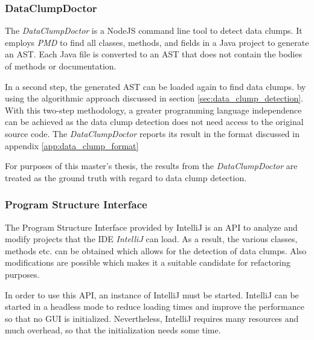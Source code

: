 \subsubsection{DataClumpDoctor} \label{sec:data_clump_doctor}

The  \textit{DataClumpDoctor} is a NodeJS command line tool  to detect data clumps. It employs \textit{PMD} to find all classes, methods, and fields in a Java project to generate an \ac{AST}. Each Java file is converted to an \ac{AST} that does not contain the bodies of methods or documentation.

In a second step, the generated \ac{AST} can be loaded again to find data clumps. by using the algorithmic approach discussed in section \ref{sec:data_clump_detection}. With this two-step methodology, a greater programming language independence can be achieved as the data clump detection does not need access to the original source code. The \textit{DataClumpDoctor} reports its result in the format discussed in appendix \ref{app:data_clump_format}

For purposes of this master's thesis, the results from the \textit{DataClumpDoctor} are treated as the ground truth with regard to data clump detection. 

\subsubsection{ Program Structure Interface}\label{sec:psi}
The Program Structure Interface provided by IntelliJ is an \ac{API} to analyze and modify  projects that the \ac{IDE} \textit{IntelliJ} can load. As a result, the various classes, methods etc. can be obtained which allows for the detection of data clumps. Also modifications are possible which makes it a suitable candidate for refactoring purposes.

In order to use this API, an instance of IntelliJ must be started. IntelliJ can be started in a headless mode to reduce loading times and improve the performance so that no GUI is initialized. Nevertheless, IntelliJ requires many resources and much overhead, so that  the initialization needs some time.






